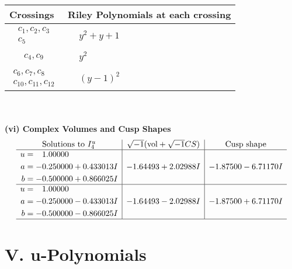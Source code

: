 \documentclass[1p]{elsarticle_modified}
\theoremstyle{definition}
\newcommand{\I}{\sqrt{-1}}
\begin{document}
\begin{tabular}{m{50pt}|m{274pt}}
Crossings & \hspace{64pt}Riley Polynomials at each crossing \\
\hline $$\begin{aligned}c_{1},c_{2},c_{3}\\c_{5}\end{aligned}$$&$\begin{aligned}
&y^2+y+1
\end{aligned}$\\
\hline $$\begin{aligned}c_{4},c_{9}\end{aligned}$$&$\begin{aligned}
&y^2
\end{aligned}$\\
\hline $$\begin{aligned}c_{6},c_{7},c_{8}\\c_{10},c_{11},c_{12}\end{aligned}$$&$\begin{aligned}
&(y-1)^2
\end{aligned}$\\
\hline
\end{tabular}\\~\\
\newpage\flushleft \textbf{(vi) Complex Volumes and Cusp Shapes}
$$\begin{array}{c|c|c}  
\text{Solutions to }I^u_{4}& \I (\text{vol} + \sqrt{-1}CS) & \text{Cusp shape}\\
 \hline 
\begin{aligned}
u &= \phantom{-}1.00000\phantom{ +0.000000I} \\
a &= -0.250000 + 0.433013 I \\
b &= -0.500000 + 0.866025 I\end{aligned}
 & -1.64493 + 2.02988 I & -1.87500 - 6.71170 I \\ \hline\begin{aligned}
u &= \phantom{-}1.00000\phantom{ +0.000000I} \\
a &= -0.250000 - 0.433013 I \\
b &= -0.500000 - 0.866025 I\end{aligned}
 & -1.64493 - 2.02988 I & -1.87500 + 6.71170 I\\
 \hline 
 \end{array}$$\newpage
\newpage\renewcommand{\arraystretch}{1}
\centering \section*{ V. u-Polynomials}
\end{document}

